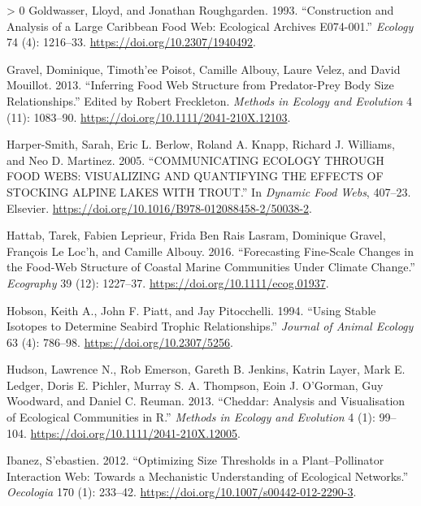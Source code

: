 \documentclass{article}
\newlength{\cslhangindent}
\newenvironment{CSLReferences}[3] %
 {%
  \setlength{\parindent}{0pt}
  \ifodd #1 \everypar{\setlength{\hangindent}{\cslhangindent}}\ignorespaces\fi
  \ifnum #2 > 0
  \setlength{\parskip}{#2\baselineskip}
  \fi
 }%
 {}
\begin{document}
\begin{CSLReferences}{1}{0}
\leavevmode\hypertarget{ref-goldwasserConstructionAnalysisLarge1993}{}%
Goldwasser, Lloyd, and Jonathan Roughgarden. 1993. {``Construction and
{Analysis} of a {Large Caribbean Food Web}: {Ecological Archives
E074}-001.''} \emph{Ecology} 74 (4): 1216--33.
\url{https://doi.org/10.2307/1940492}.

\leavevmode\hypertarget{ref-gravelInferringFoodWeb2013}{}%
Gravel, Dominique, Timoth'ee Poisot, Camille Albouy, Laure Velez, and
David Mouillot. 2013. {``Inferring Food Web Structure from Predator-Prey
Body Size Relationships.''} Edited by Robert Freckleton. \emph{Methods
in Ecology and Evolution} 4 (11): 1083--90.
\url{https://doi.org/10.1111/2041-210X.12103}.

\leavevmode\hypertarget{ref-harper-smithCOMMUNICATINGECOLOGYFOOD2005}{}%
Harper-Smith, Sarah, Eric L. Berlow, Roland A. Knapp, Richard J.
Williams, and Neo D. Martinez. 2005. {``{COMMUNICATING ECOLOGY THROUGH
FOOD WEBS}: {VISUALIZING AND QUANTIFYING THE EFFECTS OF STOCKING ALPINE
LAKES WITH TROUT}.''} In \emph{Dynamic {Food Webs}}, 407--23.
{Elsevier}. \url{https://doi.org/10.1016/B978-012088458-2/50038-2}.

\leavevmode\hypertarget{ref-hattabForecastingFinescaleChanges2016}{}%
Hattab, Tarek, Fabien Leprieur, Frida Ben Rais Lasram, Dominique Gravel,
François Le Loc'h, and Camille Albouy. 2016. {``Forecasting Fine-Scale
Changes in the Food-Web Structure of Coastal Marine Communities Under
Climate Change.''} \emph{Ecography} 39 (12): 1227--37.
\url{https://doi.org/10.1111/ecog.01937}.

\leavevmode\hypertarget{ref-hobsonUsingStableIsotopes1994}{}%
Hobson, Keith A., John F. Piatt, and Jay Pitocchelli. 1994. {``Using
{Stable Isotopes} to {Determine Seabird Trophic Relationships}.''}
\emph{Journal of Animal Ecology} 63 (4): 786--98.
\url{https://doi.org/10.2307/5256}.

\leavevmode\hypertarget{ref-hudsonCheddarAnalysisVisualisation2013}{}%
Hudson, Lawrence N., Rob Emerson, Gareth B. Jenkins, Katrin Layer, Mark
E. Ledger, Doris E. Pichler, Murray S. A. Thompson, Eoin J. O'Gorman,
Guy Woodward, and Daniel C. Reuman. 2013. {``Cheddar: Analysis and
Visualisation of Ecological Communities in {R}.''} \emph{Methods in
Ecology and Evolution} 4 (1): 99--104.
\url{https://doi.org/10.1111/2041-210X.12005}.

\leavevmode\hypertarget{ref-ibanezOptimizingSizeThresholds2012}{}%
Ibanez, S'ebastien. 2012. {``Optimizing Size Thresholds in a
Plant--Pollinator Interaction Web: Towards a Mechanistic Understanding
of Ecological Networks.''} \emph{Oecologia} 170 (1): 233--42.
\url{https://doi.org/10.1007/s00442-012-2290-3}.


\end{CSLReferences}
\end{document}
